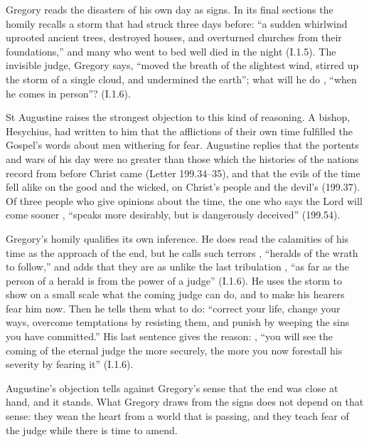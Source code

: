 Gregory reads the disasters of his own day as signs. In its final sections the
homily recalls a storm that had struck three days before: ``a sudden whirlwind
uprooted ancient trees, destroyed houses, and overturned churches from their
foundations,'' and many who went to bed well died in the night (I.1.5). The
invisible judge, Gregory says, ``moved the breath of the slightest wind,
stirred up the storm of a single cloud, and undermined the earth''; what will
he do , ``when he comes in person''?
(I.1.6).

St Augustine raises the strongest objection to this kind of reasoning. A
bishop, Hesychius, had written to him that the afflictions of their own time
fulfilled the Gospel's words about men withering for fear. Augustine replies
that the portents and wars of his day were no greater than those which the
histories of the nations record from before Christ came (Letter 199.34--35),
and that the evils of the time fell alike on the good and the wicked, on
Christ's people and the devil's (199.37). Of three people who give opinions
about the time, the one who says the Lord will come sooner
, ``speaks more
desirably, but is dangerously deceived'' (199.54).

Gregory's homily qualifies its own inference. He does read the calamities of
his time as the approach of the end, but he calls such terrors
, ``heralds of the wrath to follow,'' and adds
that they are as unlike the last tribulation , ``as far as the person of a herald is
from the power of a judge'' (I.1.6). He uses the storm to show on a small
scale what the coming judge can do, and to make his hearers fear him now. Then
he tells them what to do: ``correct your life, change your ways, overcome
temptations by resisting them, and punish by weeping the sins you have
committed.'' His last sentence gives the reason: , ``you will see the coming of the
eternal judge the more securely, the more you now forestall his severity by
fearing it'' (I.1.6).

Augustine's objection tells against Gregory's sense that the end was close at
hand, and it stands. What Gregory draws from the signs does not depend on
that sense: they wean the heart from a world that is passing, and they teach
fear of the judge while there is time to amend.

